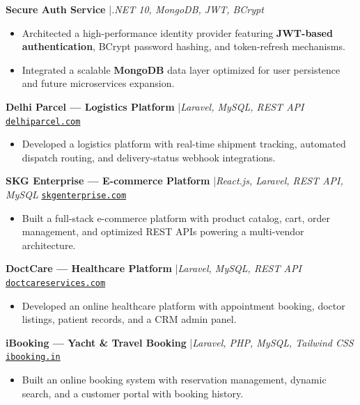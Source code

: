 \documentclass[11pt, a4paper]{article}
\begin{document}
\vspace{3pt}

\textbf{Secure Auth Service} \enspace|\enspace \textit{.NET 10, MongoDB, JWT, BCrypt}
\begin{itemize}
  \item Architected a high-performance identity provider featuring \textbf{JWT-based authentication}, BCrypt password hashing, and token-refresh mechanisms.
  \item Integrated a scalable \textbf{MongoDB} data layer optimized for user persistence and future microservices expansion.
\end{itemize}

\vspace{3pt}

\textbf{Delhi Parcel — Logistics Platform} \enspace|\enspace \textit{Laravel, MySQL, REST API} \hfill \href{https://delhiparcel.com}{\small\texttt{delhiparcel.com}}
\begin{itemize}
  \item Developed a logistics platform with real-time shipment tracking, automated dispatch routing, and delivery-status webhook integrations.
\end{itemize}

\vspace{3pt}

\textbf{SKG Enterprise — E-commerce Platform} \enspace|\enspace \textit{React.js, Laravel, REST API, MySQL} \hfill \href{https://skgenterprise.com}{\small\texttt{skgenterprise.com}}
\begin{itemize}
  \item Built a full-stack e-commerce platform with product catalog, cart, order management, and optimized REST APIs powering a multi-vendor architecture.
\end{itemize}

\vspace{3pt}

\textbf{DoctCare — Healthcare Platform} \enspace|\enspace \textit{Laravel, MySQL, REST API} \hfill \href{https://doctcareservices.com}{\small\texttt{doctcareservices.com}}
\begin{itemize}
  \item Developed an online healthcare platform with appointment booking, doctor listings, patient records, and a CRM admin panel.
\end{itemize}

\vspace{3pt}

\textbf{iBooking — Yacht \& Travel Booking} \enspace|\enspace \textit{Laravel, PHP, MySQL, Tailwind CSS} \hfill \href{https://ibooking.in}{\small\texttt{ibooking.in}}
\begin{itemize}
  \item Built an online booking system with reservation management, dynamic search, and a customer portal with booking history.
\end{itemize}
\end{document}
